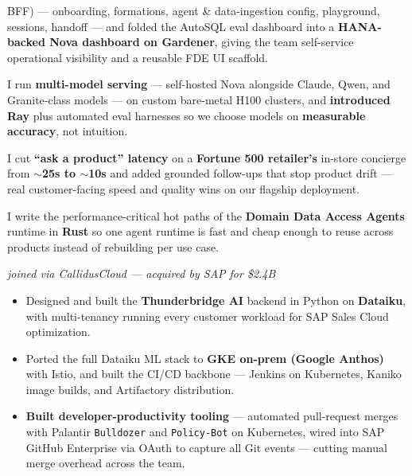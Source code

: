 \begin{itemize}
{  BFF) --- onboarding, formations, agent \& data-ingestion config, playground, sessions, handoff ---
  and folded the AutoSQL eval dashboard into a \textbf{HANA-backed Nova dashboard on Gardener}, giving
  the team self-service operational visibility and a reusable FDE UI scaffold.
  \item I run \textbf{multi-model serving} --- self-hosted Nova alongside Claude, Qwen, and
  Granite-class models --- on custom bare-metal H100 clusters, and \textbf{introduced Ray} plus
  automated eval harnesses so we choose models on \textbf{measurable accuracy}, not intuition.
  \item I cut \textbf{``ask a product'' latency} on a \textbf{Fortune 500 retailer's} in-store concierge
  from \textbf{$\sim$25s to $\sim$10s} and added grounded follow-ups that stop product drift --- real
  customer-facing speed and quality wins on our flagship deployment.
  \item I write the performance-critical hot paths of the \textbf{Domain Data Access Agents} runtime in
  \textbf{Rust} so one agent runtime is fast and cheap enough to reuse across products instead of
  rebuilding per use case.%
  }
\end{itemize}
\vspace{\entrygap}

{\small\itshape joined via CallidusCloud --- acquired by SAP for \$2.4B}\par\vspace{1.5pt}
\begin{itemize}
  \item Designed and built the \textbf{Thunderbridge AI} backend in Python on \textbf{Dataiku}, with
  multi-tenancy running every customer workload for SAP Sales Cloud optimization.
  \item Ported the full Dataiku ML stack to \textbf{GKE on-prem (Google Anthos)} with Istio, and built
  the CI/CD backbone --- Jenkins on Kubernetes, Kaniko image builds, and Artifactory distribution.
  \item \textbf{Built developer-productivity tooling} --- automated pull-request merges with Palantir
  \texttt{Bulldozer} and \texttt{Policy-Bot} on Kubernetes, wired into SAP GitHub Enterprise via OAuth
  to capture all Git events --- cutting manual merge overhead across the team.
\end{itemize}

